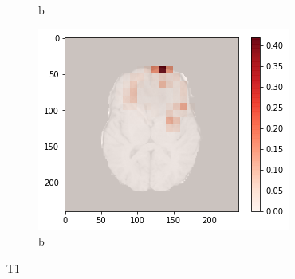 \begin{figure}[H]
\begin{subfigure}{.33\textwidth}
        \caption{b}
    \end{subfigure}
        \begin{subfigure}{.33\textwidth}
        \centering
        \includegraphics[width=\linewidth]{chapters/07_brats3d/images/09_t1_hdm10.png}
        \caption{b}
    \end{subfigure}
    \caption{T1}
\end{figure}

